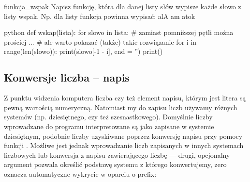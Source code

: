 \documentclass{pdfBooklets}
\begin{document}
\begin{Zadanie}{}{funkcja_wspak}
Napisz funkcję, która dla danej listy słów wypisze każde słowo z listy wspak. Np. dla listy  funkcja powinna wypisać:
{ \ttfamily alA am atok }

\begin{rozwiazanie}{python}
def wskap(lista):
  for slowo in lista:
    # zamiast pomniższej pętli można prościej ...
    # ale warto pokazać (także) takie rozwiązanie
    for i in range(len(slowo)):
      print(slowo[-1 - i], end = '')
    print()
\end{rozwiazanie}
\end{Zadanie}


\subsection{Konwersje liczba -- napis}

Z punktu widzenia komputera liczba czy też element napisu, którym jest litera są pewną wartością numeryczną.
Natomiast my do zapisu liczb używamy różnych systemów (np. dziesiętnego, czy też szesnastkowego).
Domyślnie liczby wprowadzane do programu interpretowane są jako zapisane w systemie dziesiętnym,
podobnie liczby uzyskiwane poprzez konwersję napisu przy pomocy funkcji .
Możliwe jest jednak wprowadzanie liczb zapisanych w innych systemach liczbowych lub konwersja z napisu zawierającego liczbę ---
drugi, opcjonalny argument  pozwala określić podstawę systemu z którego konwertujemy, zero oznacza automatyczne wykrycie w oparciu o prefix:
\end{document}
